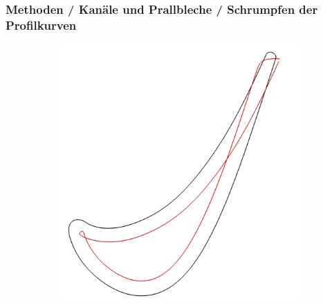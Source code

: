 \documentclass[8pt, aspectratio=169]{beamer}
\begin{document}
\begin{frame}
	\frametitle{Methoden / Kanäle und Prallbleche / Schrumpfen der Profilkurven}
	\vspace{-1cm}\hspace{-0.5cm}
	\begin{figure}
		\centering
		\begin{subfigure}[t]{.49\textwidth}
			\includegraphics[height=.8\textheight]{../tec/shrinking/11.png}
		\end{subfigure}
	\end{figure}
\end{frame}
\end{document}

